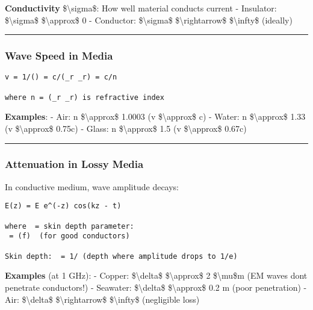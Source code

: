 \textbf{Conductivity} \$\textbackslash sigma\$: How well material
conducts current - Insulator: \$\textbackslash sigma\$
\$\textbackslash approx\$ 0 - Conductor: \$\textbackslash sigma\$
\$\textbackslash rightarrow\$ \$\textbackslash infty\$ (ideally)

\begin{center}\rule{0.5\linewidth}{0.5pt}\end{center}

\subsubsection{Wave Speed in Media}\label{wave-speed-in-media}

\begin{verbatim}
v = 1/() = c/(_r _r) = c/n

where n = (_r _r) is refractive index
\end{verbatim}

\textbf{Examples}: - Air: n \$\textbackslash approx\$ 1.0003 (v
\$\textbackslash approx\$ c) - Water: n \$\textbackslash approx\$ 1.33
(v \$\textbackslash approx\$ 0.75c) - Glass: n \$\textbackslash approx\$
1.5 (v \$\textbackslash approx\$ 0.67c)

\begin{center}\rule{0.5\linewidth}{0.5pt}\end{center}

\subsubsection{Attenuation in Lossy
Media}\label{attenuation-in-lossy-media}

In conductive medium, wave amplitude decays:

\begin{verbatim}
E(z) = E e^(-z) cos(kz - t)

where  = skin depth parameter:
 = (f)  (for good conductors)

Skin depth:  = 1/ (depth where amplitude drops to 1/e)
\end{verbatim}

\textbf{Examples} (at 1 GHz): - Copper: \$\textbackslash delta\$
\$\textbackslash approx\$ 2 \$\textbackslash mu\$m (EM waves
don\textquotesingle t penetrate conductors!) - Seawater:
\$\textbackslash delta\$ \$\textbackslash approx\$ 0.2 m (poor
penetration) - Air: \$\textbackslash delta\$
\$\textbackslash rightarrow\$ \$\textbackslash infty\$ (negligible loss)


